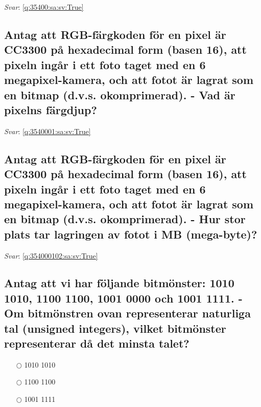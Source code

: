 \documentclass[a4paper,11pt,oneside]{article}
\begin{document}
\begin{sloppypar}
\vspace{1cm}

\textit{Svar}: \autoref{q:35400:sa:sv:True}

\subsection{Antag att RGB-f\"argkoden f\"or en pixel \"ar CC3300 p\r{a} hexadecimal form (basen 16), att pixeln ing\r{a}r i ett foto taget med en 6 megapixel-kamera, och att fotot \"ar lagrat som en bitmap (d.v.s. okomprimerad). - Vad \"ar pixelns f\"argdjup?}

\label{q:3540001:sa:sv:False}

\vspace{2cm}

\noindent\makebox[\textwidth]{\hrulefill}

\vspace{1cm}

\textit{Svar}: \autoref{q:3540001:sa:sv:True}

\subsection{Antag att RGB-f\"argkoden f\"or en pixel \"ar CC3300 p\r{a} hexadecimal form (basen 16), att pixeln ing\r{a}r i ett foto taget med en 6 megapixel-kamera, och att fotot \"ar lagrat som en bitmap (d.v.s. okomprimerad). - Hur stor plats tar lagringen av fotot i MB (mega-byte)?}

\label{q:354000102:sa:sv:False}

\vspace{2cm}

\noindent\makebox[\textwidth]{\hrulefill}

\vspace{1cm}

\textit{Svar}: \autoref{q:354000102:sa:sv:True}



\subsection{Antag att vi har f\"oljande bitm\"onster: 1010 1010, 1100 1100, 1001 0000 och 1001 1111. - Om bitm\"onstren ovan representerar naturliga tal (unsigned integers), vilket bitm\"onster representerar d\r{a} det minsta talet?}

\label{q:35500:mc:sv:False}

\begin{itemize}
  \item[$\bigcirc$] 1010 1010
  \item[$\bigcirc$] 1100 1100
  \item[$\bigcirc$] 1001 1111
\end{itemize}


\end{sloppypar}
\end{document}
